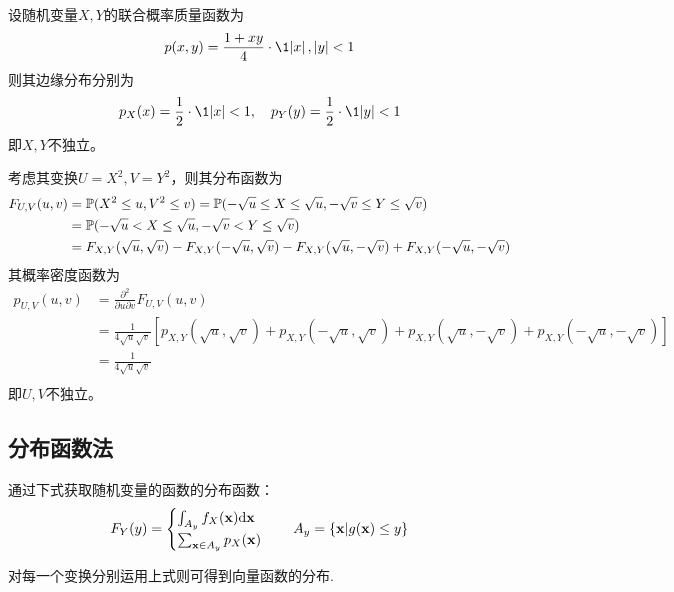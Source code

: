 \begin{example}[不独立变量的函数独立]
    设随机变量$X,Y$的联合概率质量函数为
    \[ p(x,y)=\frac{1+xy}{4} \cdot \1{\abs{x},\abs{y}<1} \]
    则其边缘分布分别为
    \[ p_X(x)=\frac{1}{2} \cdot \1{\abs{x}<1},\quad p_Y(y)=\frac{1}{2} \cdot \1{\abs{y}<1} \]
    即$X,Y$不独立。

    考虑其变换$U=X^2,V=Y^2$，则其分布函数为
    \begin{align*}
        F_{U,V}(u,v) & =\P(X^2\le u,V^2\le v)=\P(-\sqrt{u}\le X\le \sqrt{u},-\sqrt{v}\le Y\le \sqrt{v})                                 \\
                     & =\P(-\sqrt{u}< X\le \sqrt{u},-\sqrt{v}< Y\le \sqrt{v})                                                           \\
                     & =F_{X,Y}(\sqrt{u},\sqrt{v})-F_{X,Y}(-\sqrt{u},\sqrt{v})-F_{X,Y}(\sqrt{u},-\sqrt{v})+F_{X,Y}(-\sqrt{u},-\sqrt{v}) \\
    \end{align*}
    其概率密度函数为
    \begin{align*}
        p_{U,V}(u,v) & =\frac{\partial^2}{\partial u \partial v}F_{U,V}(u,v)                                                                                         \\
                     & =\frac{1}{4\sqrt{u}\sqrt{v}}[p_{X,Y}(\sqrt{u},\sqrt{v})+p_{X,Y}(-\sqrt{u},\sqrt{v})+p_{X,Y}(\sqrt{u},-\sqrt{v})+p_{X,Y}(-\sqrt{u},-\sqrt{v})] \\
                     & =\frac{1}{4\sqrt{u}\sqrt{v}}                                                                                                                  \\
    \end{align*}
    即$U,V$不独立。
\end{example}

\subsection{分布函数法}

通过下式获取随机变量的函数的分布函数：
\[ F_Y(y)=\begin{cases}
        \int_{A_y}f_X(\mathbf{x})\d\mathbf{x} \\
        \sum_{\mathbf{x} \in A_y}p_X(\mathbf{x})
    \end{cases}   \quad A_y=\{ \mathbf{x}|g(\mathbf{x}) \le y \} \]

对每一个变换分别运用上式则可得到向量函数的分布.

